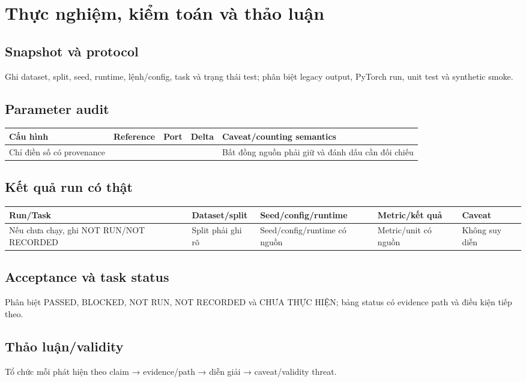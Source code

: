 \chapter{Thực nghiệm, kiểm toán và thảo luận}
\section{Snapshot và protocol}
Ghi dataset, split, seed, runtime, lệnh/config, task và trạng thái test; phân biệt legacy output, PyTorch run, unit test và synthetic smoke.
\section{Parameter audit}
\begin{longtable}{p{}r r r p{}}
\toprule Cấu hình & Reference & Port & Delta & Caveat/counting semantics \\
\midrule
Chỉ điền số có provenance & & & & Bất đồng nguồn phải giữ và đánh dấu cần đối chiếu \\
\bottomrule
\end{longtable}
\section{Kết quả run có thật}
\begin{longtable}{p{}p{}p{}p{}p{}}
\toprule Run/Task & Dataset/split & Seed/config/runtime & Metric/kết quả & Caveat \\
\midrule
Nếu chưa chạy, ghi NOT RUN/NOT RECORDED & Split phải ghi rõ & Seed/config/runtime có nguồn & Metric/unit có nguồn & Không suy diễn \\
\bottomrule
\end{longtable}
\section{Acceptance và task status}
Phân biệt PASSED, BLOCKED, NOT RUN, NOT RECORDED và CHƯA THỰC HIỆN; bảng status có evidence path và điều kiện tiếp theo.
\section{Thảo luận/validity}
Tổ chức mỗi phát hiện theo claim → evidence/path → diễn giải → caveat/validity threat.